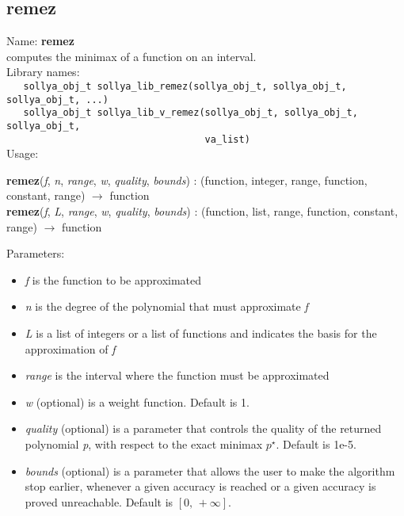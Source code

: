 \subsection{remez}
\label{labremez}
\noindent Name: \textbf{remez}\\
\phantom{aaa}computes the minimax of a function on an interval.\\[0.2cm]
\noindent Library names:\\
\verb|   sollya_obj_t sollya_lib_remez(sollya_obj_t, sollya_obj_t, sollya_obj_t, ...)|\\
\verb|   sollya_obj_t sollya_lib_v_remez(sollya_obj_t, sollya_obj_t, sollya_obj_t,|\\
\verb|                                   va_list)|\\[0.2cm]
\noindent Usage: 
\begin{center}
\textbf{remez}(\emph{f}, \emph{n}, \emph{range}, \emph{w}, \emph{quality}, \emph{bounds}) : (\textsf{function}, \textsf{integer}, \textsf{range}, \textsf{function}, \textsf{constant}, \textsf{range}) $\rightarrow$ \textsf{function}\\
\textbf{remez}(\emph{f}, \emph{L}, \emph{range}, \emph{w}, \emph{quality}, \emph{bounds}) : (\textsf{function}, \textsf{list}, \textsf{range}, \textsf{function}, \textsf{constant}, \textsf{range}) $\rightarrow$ \textsf{function}\\
\end{center}
Parameters: 
\begin{itemize}
\item \emph{f} is the function to be approximated
\item \emph{n} is the degree of the polynomial that must approximate \emph{f}
\item \emph{L} is a list of integers or a list of functions and indicates the basis for the approximation of \emph{f}
\item \emph{range} is the interval where the function must be approximated
\item \emph{w} (optional) is a weight function. Default is 1.
\item \emph{quality} (optional) is a parameter that controls the quality of the returned polynomial \emph{p}, with respect to the exact minimax $p^\star$. Default is 1e-5.
\item \emph{bounds} (optional) is a parameter that allows the user to make the algorithm stop earlier, whenever a given accuracy is reached or a given accuracy is proved unreachable. Default is $[0,\,+\infty]$.
\end{itemize}
